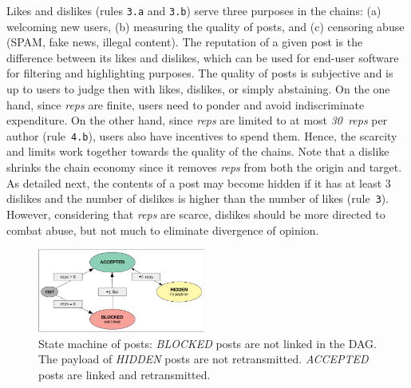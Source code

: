 \documentclass[10pt,journal,compsoc]{IEEEtran}
\newcommand{\reps}     {\emph{reps}\xspace}
\newcommand{\nreps}[1] {\emph{#1~reps\xspace}}
\begin{document}
Likes and dislikes (rules \texttt{3.a} and \texttt{3.b}) serve three purposes
in the chains:
    (a) welcoming new users, (b) measuring the quality of posts, and
    (c) censoring abuse (SPAM, fake news, illegal content).
%
The reputation of a given post is the difference between its likes and
dislikes, which can be used for end-user software for filtering and
highlighting purposes.
%
The quality of posts is subjective and is up to users to judge then with likes,
dislikes, or simply abstaining.
On the one hand, since \reps are finite, users need to ponder and avoid
indiscriminate expenditure.
On the other hand, since \reps are limited to at most \nreps{30} per author
(rule~\texttt{4.b}), users also have incentives to spend them.
Hence, the scarcity and limits work together towards the quality of the chains.
%
Note that a dislike shrinks the chain economy since it removes \reps from both
the origin and target.
As detailed next, the contents of a post may become hidden if it has at least 3
dislikes and the number of dislikes is higher than the number of likes
(rule~\texttt{3}).
However, considering that \reps are scarce, dislikes should be more directed to
combat abuse, but not much to eliminate divergence of opinion.

\begin{figure}[ht]
\centering
\includegraphics[width=0.49\textwidth]{state.png}
\caption{
    State machine of posts:
    \emph{BLOCKED} posts are not linked in the DAG.
    The payload of \emph{HIDDEN} posts are not retransmitted.
    \emph{ACCEPTED} posts are linked and retransmitted.
}
\label{fig.state}
\end{figure}
\end{document}
